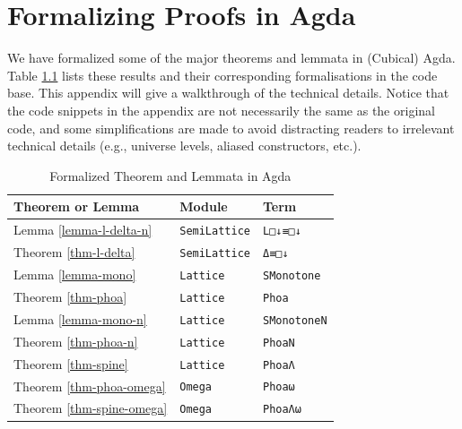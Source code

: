 
\chapter{Formalizing Proofs in Agda}
\label{apdx-agda}

We have formalized some of the major theorems and lemmata in (Cubical) Agda. Table \ref{tab-agda} lists these results and their corresponding formalisations in the code base. This appendix will give a walkthrough of the technical details. Notice that the code snippets in the appendix are not necessarily the same as the original code, and some simplifications are made to avoid distracting readers to irrelevant technical details (e.g., universe levels, aliased constructors, etc.).

\begin{table}[h]
    \centering
    \begin{tabular}{l|l|l}
    Theorem or Lemma & Module & Term \\ \hline
    Lemma \ref{lemma-l-delta-n} & \verb|SemiLattice| & \verb|L□↓≡□↓| \\ \hline
    Theorem \ref{thm-l-delta} & \verb|SemiLattice| & \verb|Δ≡□↓| \\ \hline
    Lemma \ref{lemma-mono} & \verb|Lattice| & \verb|SMonotone| \\ \hline
    Theorem \ref{thm-phoa} & \verb|Lattice| & \verb|Phoa| \\ \hline
    Lemma \ref{lemma-mono-n} & \verb|Lattice| & \verb|SMonotoneN| \\ \hline
    Theorem \ref{thm-phoa-n} & \verb|Lattice| & \verb|PhoaN| \\ \hline
    Theorem \ref{thm-spine} & \verb|Lattice| & \verb|PhoaΛ| \\ \hline
    Theorem \ref{thm-phoa-omega} & \verb|Omega| & \verb|Phoaω| \\ \hline
    Theorem \ref{thm-spine-omega} & \verb|Omega| & \verb|PhoaΛω| \\ 
    \end{tabular}
    \caption{Formalized Theorem and Lemmata in Agda}
    \label{tab-agda}
\end{table}

